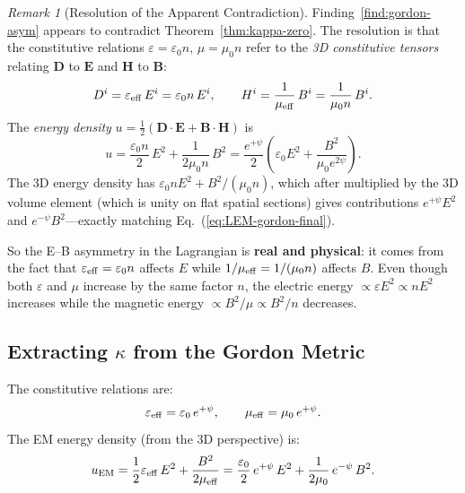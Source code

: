 \documentclass[11pt,a4paper]{article}
\theoremstyle{definition}
\theoremstyle{remark}
\newtheorem{remark}{Remark}
\begin{document}
\begin{remark}[Resolution of the Apparent Contradiction]
Finding~\ref{find:gordon-asym} appears to contradict Theorem~\ref{thm:kappa-zero}.
The resolution is that the constitutive relations
$\varepsilon = \varepsilon_0 n$, $\mu = \mu_0 n$ refer to the
\textit{3D constitutive tensors} relating $\mathbf{D}$ to $\mathbf{E}$
and $\mathbf{H}$ to $\mathbf{B}$:
\begin{equation}
D^i = \varepsilon_{\rm eff}\,E^i = \varepsilon_0 n\,E^i, \qquad
H^i = \frac{1}{\mu_{\rm eff}}\,B^i = \frac{1}{\mu_0 n}\,B^i.
\end{equation}
The \textit{energy density} $u = \frac{1}{2}(\mathbf{D}\cdot\mathbf{E}
+ \mathbf{B}\cdot\mathbf{H})$ is
\begin{equation}
u = \frac{\varepsilon_0 n}{2}\,E^2 + \frac{1}{2\mu_0 n}\,B^2
= \frac{e^{+\psi}}{2}\!\left(\varepsilon_0 E^2 + \frac{B^2}{\mu_0 e^{2\psi}}\right).
\end{equation}
The 3D energy density has $\varepsilon_0 n E^2 + B^2/(\mu_0 n)$, which
after multiplied by the 3D volume element (which is unity on flat spatial
sections) gives contributions $e^{+\psi}E^2$ and $e^{-\psi}B^2$---exactly
matching Eq.~(\ref{eq:LEM-gordon-final}).

So the E--B asymmetry in the Lagrangian is \textbf{real and physical}:
it comes from the fact that $\varepsilon_{\rm eff} = \varepsilon_0 n$
affects $E$ while $1/\mu_{\rm eff} = 1/(\mu_0 n)$ affects $B$.  Even
though both $\varepsilon$ and $\mu$ increase by the same factor $n$,
the electric energy $\propto \varepsilon E^2 \propto nE^2$ increases
while the magnetic energy $\propto B^2/\mu \propto B^2/n$ decreases.
\end{remark}

\subsection{Extracting $\kappa$ from the Gordon Metric}

The constitutive relations are:
\begin{equation}
\varepsilon_{\rm eff} = \varepsilon_0\,e^{+\psi}, \qquad
\mu_{\rm eff} = \mu_0\,e^{+\psi}.
\end{equation}
The EM energy density (from the 3D perspective) is:
\begin{equation}
u_{\rm EM} = \frac{1}{2}\varepsilon_{\rm eff}\,E^2
+ \frac{B^2}{2\mu_{\rm eff}}
= \frac{\varepsilon_0}{2}\,e^{+\psi}\,E^2
+ \frac{1}{2\mu_0}\,e^{-\psi}\,B^2.
\end{equation}
\end{document}
